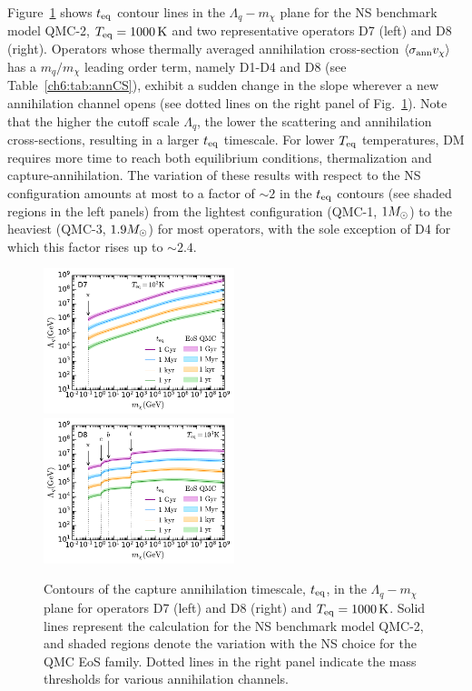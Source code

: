 Figure~\ref{app:fig:ann_xs_plots} shows $t_{\rm eq}$ contour lines in the $\Lambda_q-m_\chi$ plane for the NS benchmark model QMC-2, $\Tstareq=1000\K$ and two representative operators D7 (left) and D8 (right). 
Operators whose thermally averaged annihilation cross-section $\langle \sigma_{\rm ann} v_\chi \rangle$ has a  $m_q/m_\chi$ leading order term, namely D1-D4 and D8 (see Table~\ref{ch6:tab:annCS}), exhibit a sudden change in the slope wherever a new annihilation channel opens (see dotted lines on the right panel of Fig.~\ref{app:fig:ann_xs_plots}). Note that the higher the cutoff scale $\Lambda_q$, the lower the scattering and annihilation cross-sections, resulting in a larger $t_{\rm eq}$ timescale. For lower $T_{\rm eq}$ temperatures, DM requires more time to reach both equilibrium conditions, thermalization and capture-annihilation. The variation of these results with respect to the NS configuration amounts at most to a factor of $\sim2$ in the $t_{\rm eq}$ contours (see shaded regions in the left panels) from the lightest configuration (QMC-1, $1M_\odot$) to the heaviest (QMC-3, $1.9M_\odot$) for most operators, with the sole exception of D4 for which this factor rises up to $\sim 2.4$. 

\begin{figure}
    \centering
    \includegraphics[width = 0.496\textwidth]{img/thermalisation/D7_Lambda_mdm_teq.pdf}
    \includegraphics[width = 0.496\textwidth]{img/thermalisation/D8_Lambda_mdm_teq.pdf}    
    \caption[Contours of the capture annihilation timescale, $t_{\rm eq}$,  in the $\Lambda_q-m_\chi$ plane for operators D7 (left) and D8 (right) and $\Tstareq=1000\K$. ]{
    Contours of the capture annihilation timescale, $t_{\rm eq}$,  in the $\Lambda_q-m_\chi$ plane for operators D7 (left) and D8 (right) and $\Tstareq=1000\K$. 
    Solid lines represent the calculation for the NS benchmark model QMC-2, and shaded regions denote the variation with the NS choice for the QMC EoS family. 
    Dotted lines in the right panel indicate the mass thresholds for various annihilation channels.  
    }
    \label{app:fig:ann_xs_plots}
\end{figure}


